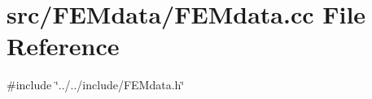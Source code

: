 \section{src/\+F\+E\+Mdata/\+F\+E\+Mdata.cc File Reference}
\label{_f_e_mdata_8cc}
{\ttfamily \#include \char`\"{}../../include/\+F\+E\+Mdata.\+h\char`\"{}}\newline
